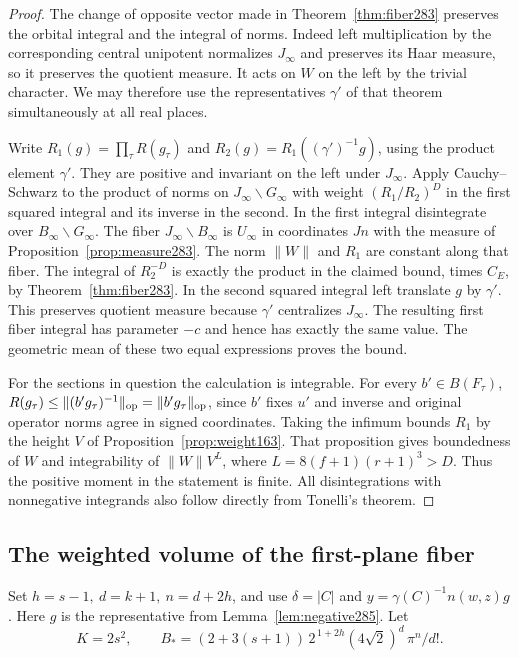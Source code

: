 \documentclass[a4paper,11pt]{article}
\theoremstyle{definition}
\theoremstyle{remark}
\numberwithin{equation}{section}
\begin{document}
\begin{proof}
The change of opposite vector made in Theorem~\ref{thm:fiber283}
preserves the orbital integral and the integral of norms.
Indeed left multiplication by the corresponding central
unipotent normalizes \(J_\infty\) and preserves its Haar
measure, so it preserves the quotient measure. It acts on
\(W\) on the left by the trivial character. We may therefore
use the representatives \(\gamma'\) of that theorem
simultaneously at all real places.

Write \(R_1(g)=\prod_\tau R(g_\tau)\) and
\(R_2(g)=R_1((\gamma')^{-1}g)\), using the product element
\(\gamma'\). They are positive and invariant on the left
under \(J_\infty\). Apply Cauchy--Schwarz to the product of
norms on \(J_\infty\backslash G_\infty\) with weight
\((R_1/R_2)^D\) in the first squared integral and its inverse
in the second. In the first integral disintegrate over
\(B_\infty\backslash G_\infty\). The fiber \(J_\infty
\backslash B_\infty\) is \(U_\infty\) in coordinates \(Jn\)
with the measure of Proposition~\ref{prop:measure283}.
The norm \(\|W\|\) and \(R_1\) are constant along that fiber.
The integral of \(R_2^{-D}\) is exactly the product in the
claimed bound, times \(C_E\), by
Theorem~\ref{thm:fiber283}. In the second squared integral
left translate \(g\) by \(\gamma'\). This preserves quotient
measure because \(\gamma'\) centralizes \(J_\infty\).
The resulting first fiber integral has parameter \(-c\)
and hence has exactly the same value. The geometric mean
of these two equal expressions proves the bound.

For the sections in question the calculation is integrable.
For every \(b'\in B(F_\tau)\), \(R(g_\tau)\le
\|(b'g_\tau)^{-1}\|_{\rm op}=\|b'g_\tau\|_{\rm op}\),
since \(b'\) fixes \(u'\) and inverse and original operator
norms agree in signed coordinates. Taking the infimum
bounds \(R_1\) by the height \(V\) of
Proposition~\ref{prop:weight163}. That proposition gives
boundedness of \(W\) and integrability of \(\|W\|V^L\),
where \(L=8(f+1)(r+1)^3>D\). Thus the positive moment in
the statement is finite. All disintegrations with nonnegative
integrands also follow directly from Tonelli's theorem.
\end{proof}

\subsection{The weighted volume of the first-plane fiber}\label{nav:V-48}
Set \(h=s-1,\ d=k+1,\ n=d+2h\), and use
\(\delta=|C|\) and \(y=\gamma(C)^{-1}n(w,z)g\).
Here \(g\) is the representative from Lemma~\ref{lem:negative285}.
Let
\[
 K=2s^2,\qquad
 B_*=(2+3(s+1))\,2^{\,1+2h}(4\sqrt2)^d\,\pi^n/d!.
\]
\end{document}
